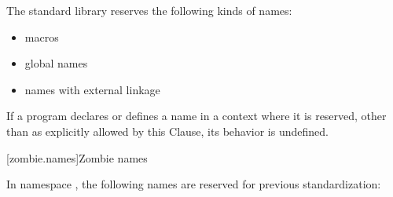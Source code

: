 \pnum
The \Cpp{} standard library reserves the following kinds of names:
\begin{itemize}
\item macros
\item global names
\item names with external linkage
\end{itemize}

\pnum
If a program declares or defines a name in a context where it is
reserved, other than as explicitly allowed by this Clause, its behavior is
undefined.%

[zombie.names]{Zombie names}%
%
%
%

\pnum
In namespace , the following names are reserved for previous standardization:

